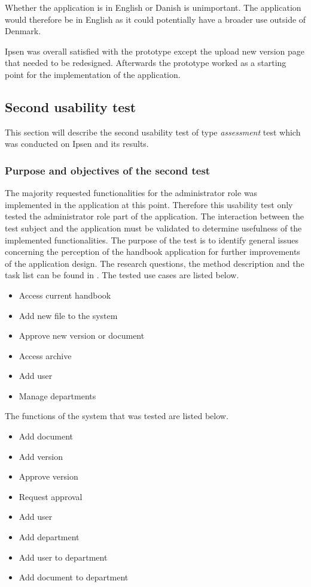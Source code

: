 Whether the application is in English or Danish is unimportant.
The application would therefore be in English as it could potentially have a broader use outside of Denmark.

Ipsen was overall satisfied with the prototype except the upload new version page that needed to be redesigned.
Afterwards the prototype worked as a starting point for the implementation of the application.

\subsection{Second usability test}\label{secondtest}
This section will describe the second usability test of type \textit{assessment} test which was conducted on Ipsen and its results.

\subsubsection*{Purpose and objectives of the second test}
The majority requested functionalities for the administrator role was implemented in the application at this point.
Therefore this usability test only tested the administrator role part of the application.
The interaction between the test subject and the application must be validated to determine usefulness of the implemented functionalities.
The purpose of the test is to identify general issues concerning the perception of the handbook application for further improvements of the application design.
The research questions, the method description and the task list can be found in .
The tested use cases are listed below.

\begin{itemize}
	\item Access current handbook
	\item Add new file to the system
	\item Approve new version or document
	\item Access archive
	\item Add user
	\item Manage departments
\end{itemize}

The functions of the system that was tested are listed below.

\begin{itemize}
	\item Add document
	\item Add version
	\item Approve version
	\item Request approval
	\item Add user
	\item Add department
	\item Add user to department
	\item Add document to department
\end{itemize}

